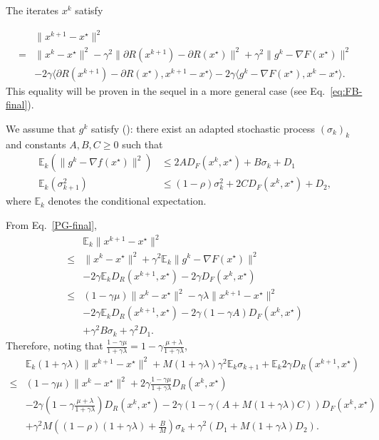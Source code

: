 \documentclass{article}
\newcommand{\bE}{{\mathbb E}}
\newcommand{\ps}[1]{\langle #1 \rangle}
\theoremstyle{definition}
\begin{document}
The iterates $x^k$ satisfy

\begin{align}
    \label{eq:PG-final}
    &\|x^{k+1} - x^\star\|^2 \\
    =& \|x^k - x^\star\|^2 -\gamma^2\|\partial R(x^{k+1}) - \partial R(x^\star)\|^2 + \gamma^2 \|g^k - \nabla F(x^\star) \|^2\\
    &- 2\gamma\ps{\partial R(x^{k+1})-\partial R(x^\star),x^{k+1}-x^\star} - 2\gamma\ps{g^k-\nabla F(x^\star),x^k-x^\star}.
\end{align}
This equality will be proven in the sequel in a more general case (see Eq.~\eqref{eq:FB-final}).

We assume that $g^k$ satisfy (\cite{gorbunov2019unified}): there exist an adapted stochastic process $(\sigma_k)_k$ and constants $A,B,C \geq 0$ such that
\begin{align}
    \bE_k(\|g^k - \nabla f(x^\star)\|^2) &\leq 2AD_F(x^k,x^\star) + B\sigma_k + D_1\\
    \bE_k(\sigma_{k+1}^2) &\leq (1-\rho)\sigma_k^2 + 2CD_F(x^k,x^\star) + D_2,
\end{align}
where $\bE_k$ denotes the conditional expectation.

From Eq.~\eqref{PG-final},
\begin{align}
    &\bE_k\|x^{k+1} - x^\star\|^2 \\
    \leq& \|x^k - x^\star\|^2 + \gamma^2 \bE_k\|g^k - \nabla F(x^\star) \|^2\\
    &- 2\gamma \bE_k D_R(x^{k+1},x^\star) - 2\gamma D_F(x^{k},x^\star)\\
    \leq& (1-\gamma \mu)\|x^k - x^\star\|^2 - \gamma \lambda \|x^{k+1} - x^\star\|^2\\
    &- 2\gamma \bE_k D_R(x^{k+1},x^\star) - 2\gamma(1 - \gamma A) D_F(x^{k},x^\star)\\
    &+ \gamma^2 B \sigma_k + \gamma^2 D_1.
\end{align}
Therefore, noting that $\frac{1-\gamma\mu}{1+\gamma\lambda} = 1-\gamma\frac{\mu+\lambda}{1+\gamma\lambda}$,
\begin{align}
    &\bE_k (1+\gamma \lambda)\|x^{k+1} - x^\star\|^2 + M(1+\gamma\lambda)\gamma^2 \bE_k \sigma_{k+1} + \bE_k 2\gamma D_R(x^{k+1},x^\star)\\
    \leq& (1-\gamma\mu)\|x^k - x^\star\|^2 + 2\gamma \frac{1-\gamma\mu}{1+\gamma\lambda} D_R(x^{k},x^\star)\\
    &- 2\gamma \left(1-\gamma\frac{\mu+\lambda}{1+\gamma\lambda}\right) D_R(x^{k},x^\star) - 2\gamma(1 - \gamma (A + M(1+\gamma\lambda)C)) D_F(x^{k},x^\star)\\
    &+ \gamma^2 M \left((1-\rho)(1+\gamma\lambda) + \frac{B}{M}\right)\sigma_k + \gamma^2 (D_1 + M(1+\gamma\lambda)D_2).
\end{align}
\end{document}
